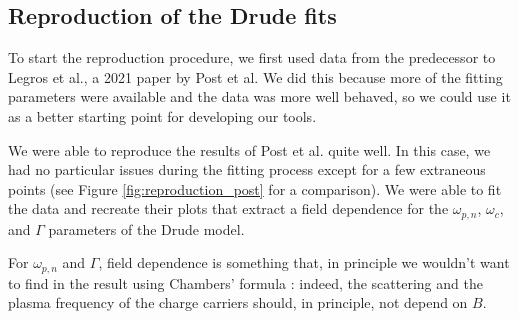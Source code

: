 \subsection{Reproduction of the Drude fits}
To start the reproduction procedure, we first used data from the predecessor to Legros et al., a 2021
paper by Post et al.\cite{post2021} We did this because more of the fitting parameters were available
and the data was more well behaved, so we could use it as a better starting point for developing our
tools.

We were able to reproduce the results of Post et al. quite well.  In this case, we had no particular
issues during the fitting process except for a few extraneous points (see Figure
\ref{fig:reproduction_post} for a comparison). We were able to fit the data
and recreate their plots that extract a field dependence for the $\omega_{p,n}$, $\omega_c$,
and $\Gamma$ parameters of the Drude model.

For $\omega_{p,n}$ and $\Gamma$, field dependence is something that, in principle we wouldn't want to find in the result using Chambers' formula : 
indeed, the scattering and the plasma frequency of the charge carriers should, 
in principle, not depend on $B$.

